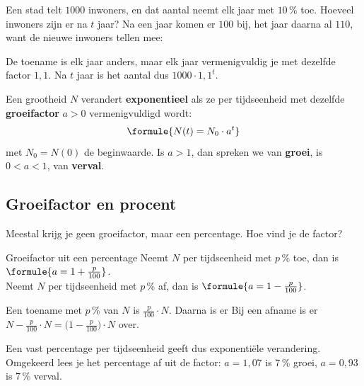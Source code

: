Een stad telt $1000$ inwoners, en dat aantal neemt elk jaar met $10$\,\% toe. Hoeveel inwoners zijn er na $t$ jaar? Na een jaar komen er $100$ bij, het jaar daarna al $110$, want de nieuwe inwoners tellen mee:


De toename is elk jaar anders, maar elk jaar vermenigvuldig je met dezelfde factor $1{,}1$. Na $t$ jaar is het aantal dus $1000 \cdot 1{,}1^t$.

\begin{theorie}
Een grootheid $N$ verandert \textbf{\textcolor{accent}{exponentieel}} als ze per tijdseenheid met dezelfde \textbf{\textcolor{accent}{groeifactor}} $a > 0$ vermenigvuldigd wordt:
\[\formule{N(t) = N_0 \cdot a^t}\]
met $N_0 = N(0)$ de beginwaarde. Is $a > 1$, dan spreken we van \textbf{\textcolor{accent}{groei}}, is $0 < a < 1$, van \textbf{\textcolor{accent}{verval}}.
\end{theorie}

\subsection{Groeifactor en procent}

Meestal krijg je geen groeifactor, maar een percentage. Hoe vind je de factor?

\begin{theorie}
\begin{stelling}{Groeifactor uit een percentage}
Neemt $N$ per tijdseenheid met $p$\,\% toe, dan is $\formule{a = 1 + \tfrac{p}{100}}$. \\
Neemt $N$ per tijdseenheid met $p$\,\% af, dan is $\formule{a = 1 - \tfrac{p}{100}}$.
\end{stelling}
\begin{bewijs}
Een toename met $p$\,\% van $N$ is $\frac{p}{100} \cdot N$. Daarna is er
Bij een afname is er $N - \frac{p}{100} \cdot N = \bigl(1 - \frac{p}{100}\bigr) \cdot N$ over.
\end{bewijs}
\end{theorie}

Een vast percentage per tijdseenheid geeft dus exponentiële verandering. Omgekeerd lees je het percentage af uit de factor: $a = 1{,}07$ is $7$\,\% groei, $a = 0{,}93$ is $7$\,\% verval.

